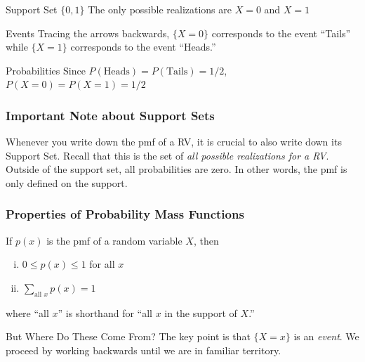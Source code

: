 \begin{frame}
\small
\begin{figure}
\centering
{}
\end{figure}
 
\begin{block}{Support Set $\{0,1\}$}
The only possible realizations are $X=0$ and $X=1$
\end{block}
 
\begin{block}{Events}
Tracing the arrows backwards, $\{X=0\}$ corresponds to the event ``Tails'' while $\{X=1\}$ corresponds to the event ``Heads.''
\end{block}
 
\begin{block}{Probabilities}
Since $P(\mbox{Heads}) = P(\mbox{Tails}) = 1/2$, $P(X=0) = P(X=1) = 1/2$
\end{block}

\end{frame}


\begin{frame}
\frametitle{Important Note about Support Sets}
Whenever you write down the pmf of a RV, it is \alert{crucial} to also write down its Support Set. Recall that this is the set of \alert{\emph{all possible realizations for a RV}}. Outside of the support set, all probabilities are zero. In other words, the pmf is \alert{only defined} on the support.

\end{frame}
\begin{frame}
\frametitle{Properties of Probability Mass Functions}

If $p(x)$ is the pmf of a random variable $X$, then
\begin{enumerate}[(i)]
	\item $0\leq p(x) \leq 1$ for all $x$ \vspace{1em}
	\item $\displaystyle \sum_{\mbox{all } x} p(x) = 1$
\end{enumerate}

\vspace{0.75em}
where ``all $x$'' is shorthand for ``all $x$ in the support of $X$.''


 

\vspace{2em}
\begin{alertblock}{But Where Do These Come From?}
The key point is that $\{X=x\}$ is an \emph{event}. We proceed by working backwards until we are in familiar territory.
\end{alertblock}

\end{frame}

